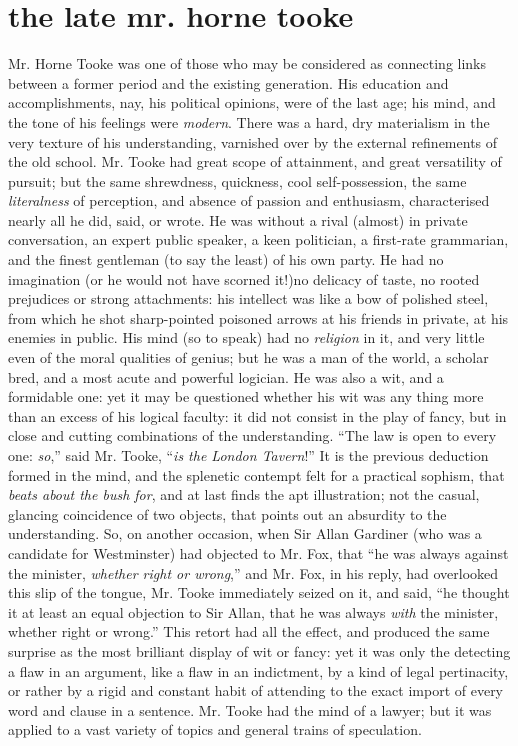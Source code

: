 \chapter[The Late Mr. Horne Tooke]{the late mr. horne tooke}

Mr. Horne Tooke was one of those who may be considered as
connecting links between a former period and the existing
generation. His education and accomplishments, nay, his political
opinions, were of the last age; his mind, and the tone of his
feelings were \emph{modern}. There was a hard, dry materialism in the
very texture of his understanding, varnished over by the external
refinements of the old school. Mr. Tooke had great scope of
attainment, and great versatility of pursuit; but the same
shrewdness, quickness, cool self-possession, the same
\emph{literalness} of perception, and absence of passion and
enthusiasm, characterised nearly all he did, said, or wrote. He
was without a rival (almost) in private conversation, an expert
public speaker, a keen politician, a first-rate grammarian, and
the finest gentleman (to say the least) of his own party. He had
no imagination (or he would not have scorned it!)\textemdash no delicacy of
taste, no rooted prejudices or strong attachments: his intellect
was like a bow of polished steel, from which he shot sharp-pointed
poisoned arrows at his friends in private, at his enemies in
public. His mind (so to speak) had no \emph{religion} in it, and very
little even of the moral qualities of genius; but he was a man of
the world, a scholar bred, and a most acute and powerful
logician. He was also a wit, and a formidable one: yet it may be
questioned whether his wit was any thing more than an excess of
his logical faculty: it did not consist in the play of fancy, but
in close and cutting combinations of the understanding. ``The law
is open to every one: \emph{so},'' said Mr. Tooke, ``\emph{is the London
Tavern}!'' It is the previous deduction formed in the mind, and the
splenetic contempt felt for a practical sophism, that \emph{beats about
the bush for}, and at last finds the apt illustration; not the
casual, glancing coincidence of two objects, that points out an
absurdity to the understanding. So, on another occasion, when Sir
Allan Gardiner (who was a candidate for Westminster) had objected
to Mr. Fox, that ``he was always against the minister, \emph{whether
right or wrong},'' and Mr. Fox, in his reply, had overlooked this
slip of the tongue, Mr. Tooke immediately seized on it, and said,
``he thought it at least an equal objection to Sir Allan, that he
was always \emph{with} the minister, whether right or wrong.'' This
retort had all the effect, and produced the same surprise as the
most brilliant display of wit or fancy: yet it was only the
detecting a flaw in an argument, like a flaw in an indictment, by
a kind of legal pertinacity, or rather by a rigid and constant
habit of attending to the exact import of every word and clause in
a sentence.  Mr. Tooke had the mind of a lawyer; but it was
applied to a vast variety of topics and general trains of
speculation.

